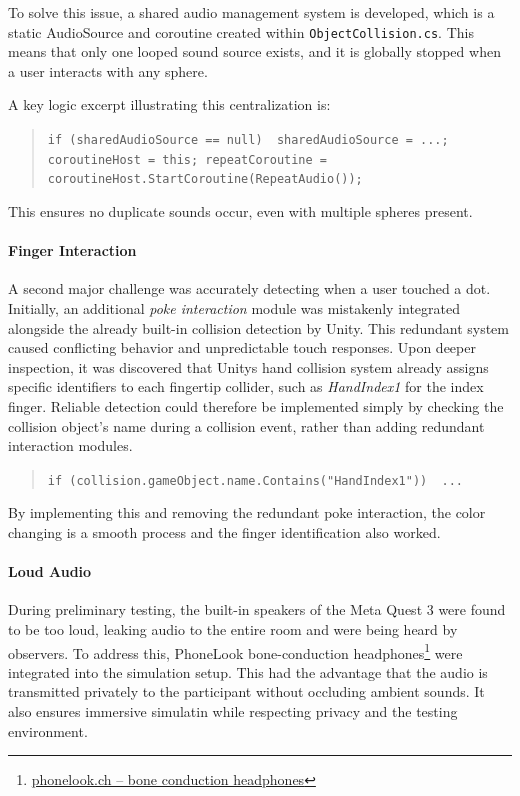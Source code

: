 To solve this issue, a shared audio management system is developed, which is a static AudioSource and coroutine created within \texttt{ObjectCollision.cs}. This means that only one looped sound source exists, and it is globally stopped when a user interacts with any sphere.

A key logic excerpt illustrating this centralization is:

\begin{quote} \small \texttt{if (sharedAudioSource == null) { sharedAudioSource = ...; coroutineHost = this; repeatCoroutine = coroutineHost.StartCoroutine(RepeatAudio());}} \end{quote}

This ensures no duplicate sounds occur, even with multiple spheres present.

\paragraph{Finger Interaction} 
A second major challenge was accurately detecting when a user touched a dot. Initially, an additional \textit{poke interaction} module was mistakenly integrated alongside the already built-in collision detection by Unity. This redundant system caused conflicting behavior and unpredictable touch responses. Upon deeper inspection, it was discovered that Unitys hand collision system already assigns specific identifiers to each fingertip collider, such as \textit{HandIndex1} for the index finger. Reliable detection could therefore be implemented simply by checking the collision object's name during a collision event, rather than adding redundant interaction modules.

\begin{quote} \small \texttt{if (collision.gameObject.name.Contains("HandIndex1")) { ... }} \end{quote}

By implementing this and removing the redundant poke interaction, the color changing is a smooth process and the finger identification also worked.

\paragraph{Loud Audio} 
During preliminary testing, the built-in speakers of the Meta Quest 3 were found to be too loud, leaking audio to the entire room and were being heard by observers. To address this, PhoneLook bone-conduction headphones\footnote{\href{https://www.phonelook.ch/de/stylische-kabellose-bluetooth-knochenleitungs-kopfhorer-fur-sport-laufen-radfahren-fitness-schwarz.html}{phonelook.ch – bone conduction headphones}} were integrated into the simulation setup. This had the advantage that the audio is transmitted privately to the participant without occluding ambient sounds.
It also ensures immersive simulatin while respecting privacy and the testing environment.

